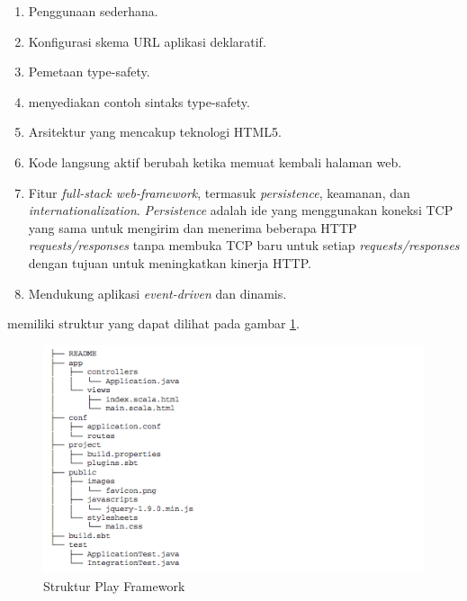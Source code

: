 \begin{enumerate}
	\item Penggunaan \play sederhana.
	\item Konfigurasi skema URL aplikasi deklaratif.
	\item Pemetaan type-safety.
	\item \play menyediakan contoh sintaks type-safety.
	\item Arsitektur yang mencakup teknologi HTML5.
	\item Kode langsung aktif berubah ketika memuat kembali halaman web.
	\item Fitur \textit{full-stack web-framework}, termasuk \textit{persistence}, keamanan, dan \textit{internationalization}. \textit{Persistence} adalah ide yang menggunakan koneksi TCP yang sama untuk mengirim dan menerima beberapa HTTP \textit{requests/responses} tanpa membuka TCP baru untuk setiap \textit{requests/responses} dengan tujuan untuk meningkatkan kinerja HTTP.
	\item Mendukung aplikasi \textit{event-driven} dan dinamis.
\end{enumerate}

\play memiliki struktur yang dapat dilihat pada gambar \ref{fig:2_play_struktur}.

\begin{figure}[H]
	\centering
	\includegraphics[scale=0.7]{Gambar/play-struktur}
	\caption{Struktur Play Framework} 
	\label{fig:2_play_struktur}
\end{figure}

